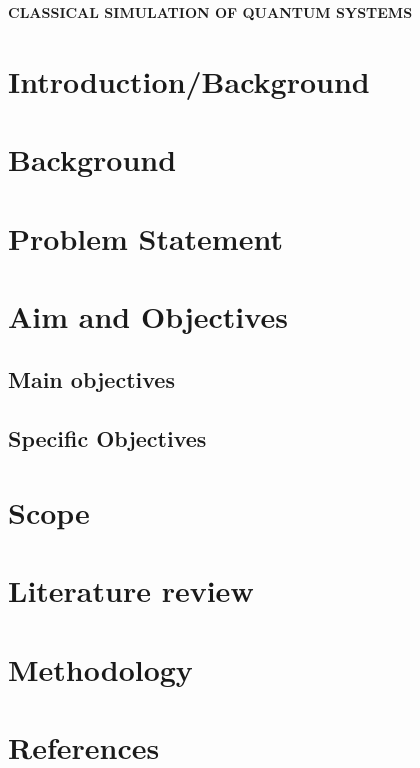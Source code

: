 \documentclass[options]{article}
\begin{document}
\textbf{CLASSICAL SIMULATION OF QUANTUM SYSTEMS}

\section{\textbf{ Introduction/Background}}

\section{\textbf{ Background }}

\section{\textbf{ Problem Statement}}

\section{\textbf{ Aim and Objectives}}

\subsection{Main objectives}

\subsection{Specific Objectives}

\section {\textbf{Scope}}

\section{\textbf{Literature review }}


\section {\textbf{Methodology}}

\section{\textbf{References}}
\end{document}
